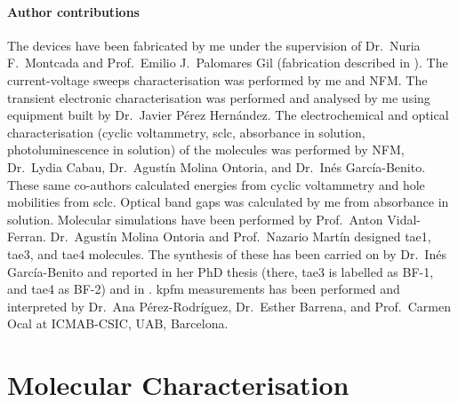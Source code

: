 	\paragraph{Author contributions}
	The devices have been fabricated by me under the supervision of Dr.\ Nuria F.\ Montcada and Prof.\ Emilio J.\ Palomares Gil (fabrication described in ).
	The current\hyp{}voltage sweeps characterisation was performed by me and NFM\@.
	The transient electronic characterisation was performed and analysed by me using equipment built by Dr.\ Javier Pérez Hernández.
	The electrochemical and optical characterisation (cyclic voltammetry, \gls{sclc}, absorbance in solution, photoluminescence in solution) of the molecules was performed by NFM, Dr.\ Lydia Cabau, Dr.\ Agustín Molina Ontoria, and Dr.\ Inés García\hyp{}Benito.
	These same co-authors calculated  energies from cyclic voltammetry and hole mobilities from \gls{sclc}.
	Optical band gaps was calculated by me from absorbance in solution.
	Molecular simulations have been performed by Prof.\ Anton Vidal\hyp{}Ferran.
	Dr.\ Agustín Molina Ontoria and Prof.\ Nazario Martín designed \gls{tae1}, \gls{tae3}, and \gls{tae4} molecules.
	The synthesis of these has been carried on by Dr.\ Inés García\hyp{}Benito and reported in her PhD thesis \cite{Garcia-Benito2017} (there, \gls{tae3} is labelled as BF-1, and \gls{tae4} as BF-2) and in \cite{Gelmetti2019}.
	\Gls{kpfm} measurements has been performed and interpreted by Dr.\ Ana Pérez-Rodríguez, Dr.\ Esther Barrena, and Prof.\ Carmen Ocal at ICMAB-CSIC, UAB, Barcelona.



\section{Molecular Characterisation}

